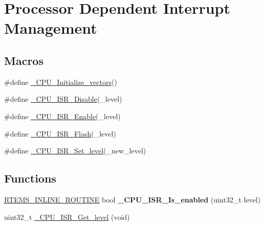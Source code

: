\hypertarget{group__RTEMSScoreCPUBfinCPUInterrupt}{}\section{Processor Dependent Interrupt Management}
\label{group__RTEMSScoreCPUBfinCPUInterrupt}
\subsection*{Macros}
\begin{DoxyCompactItemize}
\item 
\#define \mbox{\hyperlink{group__RTEMSScoreCPUBfinCPUInterrupt_gad1ef5062849284d81496e1e6d33fb7ff}{\+\_\+\+C\+P\+U\+\_\+\+Initialize\+\_\+vectors}}()
\item 
\#define \mbox{\hyperlink{group__RTEMSScoreCPUBfinCPUInterrupt_gabc05c31eff429870b8564553d9eae054}{\+\_\+\+C\+P\+U\+\_\+\+I\+S\+R\+\_\+\+Disable}}(\+\_\+level)
\item 
\#define \mbox{\hyperlink{group__RTEMSScoreCPUBfinCPUInterrupt_ga01f5da058924ecbc4c84ceb8613145a0}{\+\_\+\+C\+P\+U\+\_\+\+I\+S\+R\+\_\+\+Enable}}(\+\_\+level)
\item 
\#define \mbox{\hyperlink{group__RTEMSScoreCPUBfinCPUInterrupt_gab06bc7d1751ca97bbe1f4c50d14c4453}{\+\_\+\+C\+P\+U\+\_\+\+I\+S\+R\+\_\+\+Flash}}(\+\_\+level)
\item 
\#define \mbox{\hyperlink{group__RTEMSScoreCPUBfinCPUInterrupt_ga0d657d03b719953545e72902cad21689}{\+\_\+\+C\+P\+U\+\_\+\+I\+S\+R\+\_\+\+Set\+\_\+level}}(\+\_\+new\+\_\+level)
\end{DoxyCompactItemize}
\subsection*{Functions}
\begin{DoxyCompactItemize}
\item 
\mbox{\label{group__RTEMSScoreCPUBfinCPUInterrupt_ga5254669b54a06e96ebb585fd50a02c4d}} 
\mbox{\hyperlink{group__RTEMSScoreBaseDefs_gac216239df231d5dbd15e3520b0b9313f}{R\+T\+E\+M\+S\+\_\+\+I\+N\+L\+I\+N\+E\+\_\+\+R\+O\+U\+T\+I\+NE}} bool {\bfseries \+\_\+\+C\+P\+U\+\_\+\+I\+S\+R\+\_\+\+Is\+\_\+enabled} (uint32\+\_\+t level)
\item 
uint32\+\_\+t \mbox{\hyperlink{group__RTEMSScoreCPUBfinCPUInterrupt_ga1d9dcab9170d532b6634a5620385adbd}{\+\_\+\+C\+P\+U\+\_\+\+I\+S\+R\+\_\+\+Get\+\_\+level}} (void)
\end{DoxyCompactItemize}


